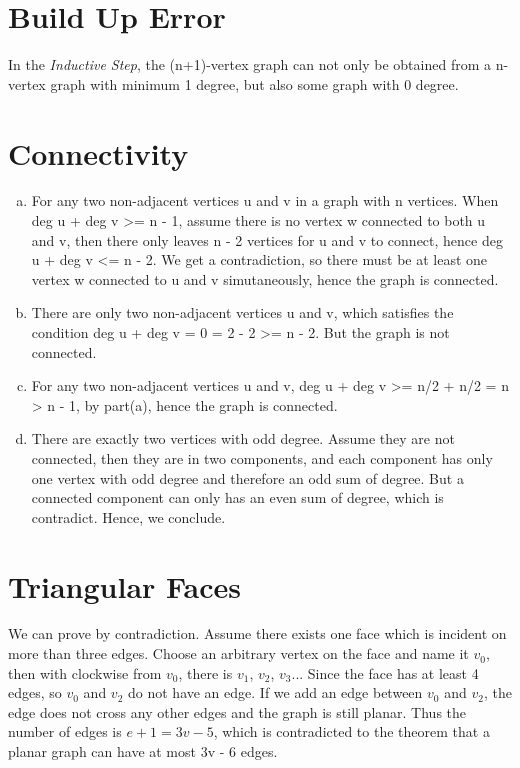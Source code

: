 \documentclass{article}
\begin{document}
\part*{Build Up Error}
    In the \emph{Inductive Step}, the (n+1)-vertex graph can not only be obtained from 
    a n-vertex graph with minimum 1 degree, but also some graph with 0 degree.
    
\part*{Connectivity}

\begin{enumerate}[(a).]
    \item For any two non-adjacent vertices u and v in a graph with n vertices. 
    When deg u + deg v >= n - 1, assume there is no vertex w connected to both u and v, 
    then there only leaves n - 2 vertices for u and v to connect, hence deg u + deg v <= n - 2.
    We get a contradiction, so there must be at least one vertex w connected to u and v simutaneously, 
    hence the graph is connected.

    \item There are only two non-adjacent vertices u and v, 
    which satisfies the condition deg u + deg v = 0 = 2 - 2 >= n - 2. 
    But the graph is not connected.

    \item For any two non-adjacent vertices u and v, deg u + deg v >= 
    n/2 + n/2 = n > n - 1, by part(a), hence the graph is connected.

    \item There are exactly two vertices with odd degree. 
    Assume they are not connected, then they are in two components, 
    and each component has only one vertex with odd degree and therefore 
    an odd sum of degree. But a connected component can only has an even sum of degree, which is contradict. 
    Hence, we conclude.
\end{enumerate}

\part*{Triangular Faces}
We can prove by contradiction. Assume there exists one face which is incident on more than three edges. 
Choose an arbitrary vertex on the face and name it $v_0$, then with clockwise from $v_0$, 
there is $v_1$, $v_2$, $v_3$... Since the face has at least 4 edges, so $v_0$ and $v_2$ do not have an edge. 
If we add an edge between $v_0$ and $v_2$, the edge does not cross any other edges and the graph is still planar. 
Thus the number of edges is $e + 1 = 3v - 5$, which is contradicted to the theorem that a planar graph can have at most 3v - 6 edges.
\end{document}
